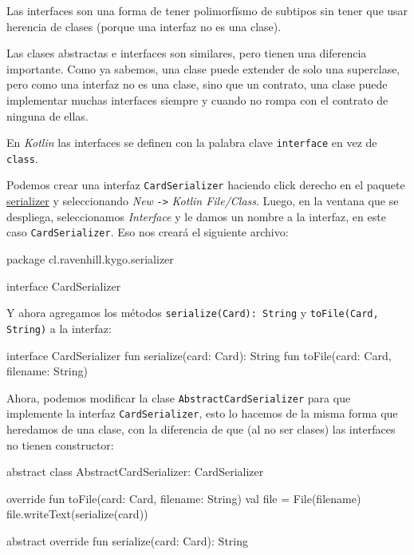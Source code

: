   \begin{important}
    Las interfaces son una forma de tener polimorfísmo de subtipos sin tener que usar herencia de 
    clases (porque una interfaz no es una clase).  
  \end{important}
  
  Las clases abstractas e interfaces son similares, pero tienen una diferencia importante.
  Como ya sabemos, una clase puede extender de solo una superclase, pero como una interfaz no es una
  clase, sino que un contrato, una clase puede implementar muchas interfaces siempre y cuando no
  rompa con el contrato de ninguna de ellas.
  
  En \textit{Kotlin} las interfaces se definen con la palabra clave \texttt{interface} en vez de
  \texttt{class}.

  Podemos crear una interfaz \texttt{CardSerializer} haciendo click derecho en el paquete
  \url{serializer} y seleccionando \textit{New} \texttt{->} \textit{Kotlin File/Class}.
  Luego, en la ventana que se despliega, seleccionamos \textit{Interface} y le damos un nombre a la
  interfaz, en este caso \texttt{CardSerializer}.
  Eso nos creará el siguiente archivo:

  \begin{kotlin}
    package cl.ravenhill.kygo.serializer

    interface CardSerializer {
    }
  \end{kotlin}

  Y ahora agregamos los métodos \texttt{serialize(Card): String} y \texttt{toFile(Card, String)} a la interfaz:

  \begin{kotlin}
    interface CardSerializer {
      fun serialize(card: Card): String
      fun toFile(card: Card, filename: String)
    }
  \end{kotlin}

  Ahora, podemos modificar la clase \texttt{AbstractCardSerializer} para que implemente la interfaz
  \texttt{CardSerializer}, esto lo hacemos de la misma forma que heredamos de una clase, con la
  diferencia de que (al no ser clases) las interfaces no tienen constructor:

  \begin{kotlin}
    abstract class AbstractCardSerializer: CardSerializer {
      override fun toFile(card: Card, filename: String) {
        val file = File(filename)
        file.writeText(serialize(card))
      }

      abstract override fun serialize(card: Card): String
    }
  \end{kotlin}

